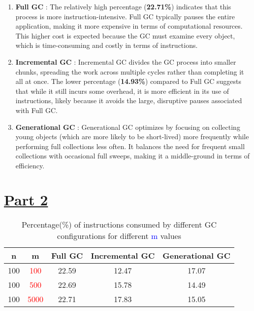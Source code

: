 \documentclass[11pt,paper=a4,answers]{exam}
\begin{document}
\noindent
\begin{enumerate}
    \item \textbf{Full GC} : The relatively high percentage (\textbf{22.71\%}) indicates that this process is more instruction-intensive. Full GC typically pauses the entire application, making it more expensive in terms of computational resources. This higher cost is expected because the GC must examine every object, which is time-consuming and costly in terms of instructions.
    \item \textbf{Incremental GC} : Incremental GC divides the GC process into smaller chunks, spreading the work across multiple cycles rather than completing it all at once. The lower percentage (\textbf{14.93\%}) compared to Full GC suggests that while it still incurs some overhead, it is more efficient in its use of instructions, likely because it avoids the large, disruptive pauses associated with Full GC. 
    \item \textbf{Generational GC} : Generational GC optimizes by focusing on collecting young objects (which are more likely to be short-lived) more frequently while performing full collections less often. It balances the need for frequent small collections with occasional full sweeps, making it a middle-ground in terms of efficiency.
\end{enumerate}

\section*{\underline{Part 2}}
\begin{table}[h!]
    \begin{center}
        \begin{tabular}{|c|c|c|c|c|}
            \hline
            \textbf{n} & \textbf{m} & \textbf{Full GC} & \textbf{Incremental GC} & \textbf{Generational GC} \\
            \hline
            100 & \textcolor{red}{100} & 22.59 & 12.47 & 17.07 \\
            \hline
            100 & \textcolor{red}{500} & 22.69 & 15.78 & 14.49 \\
            \hline
            100 & \textcolor{red}{5000} & 22.71 & 17.83 & 15.05 \\
            \hline
        \end{tabular}
        \caption{Percentage(\%) of instructions consumed by different GC configurations for different \textcolor{blue}{m} values}
        \label{table:2}
    \end{center}
\end{table}
\end{document}
